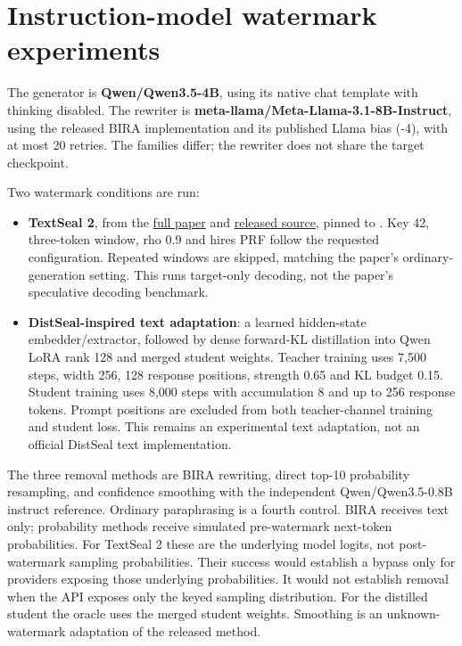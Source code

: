 \section{Instruction-model watermark
experiments}\label{record-docs-instruct-watermarking-md-instruction-model-watermark-experiments}

The generator is \textbf{Qwen/Qwen3.5-4B}, using its native chat
template with thinking disabled. The rewriter is
\textbf{meta-llama/Meta-Llama-3.1-8B-Instruct}, using the released BIRA
implementation and its published Llama bias (-4), with at most 20
retries. The families differ; the rewriter does not share the target
checkpoint.

Two watermark conditions are run:

\begin{itemize}
\tightlist
\item
  \textbf{TextSeal 2}, from the
  \href{https://arxiv.org/pdf/2610.40613}{full paper} and
  \href{https://github.com/facebookresearch/textseal}{released source},
  pinned to
  \texttt{}. Key 42,
  three-token window, rho 0.9 and hires PRF follow the requested
  configuration. Repeated windows are skipped, matching the paper's
  ordinary-generation setting. This runs target-only decoding, not the
  paper's speculative decoding benchmark.
\item
  \textbf{DistSeal-inspired text adaptation}: a learned hidden-state
  embedder/extractor, followed by dense forward-KL distillation into
  Qwen LoRA rank 128 and merged student weights. Teacher training uses
  7,500 steps, width 256, 128 response positions, strength 0.65 and KL
  budget 0.15. Student training uses 8,000 steps with accumulation 8 and
  up to 256 response tokens. Prompt positions are excluded from both
  teacher-channel training and student loss. This remains an
  experimental text adaptation, not an official DistSeal text
  implementation.
\end{itemize}

The three removal methods are BIRA rewriting, direct top-10 probability
resampling, and confidence smoothing with the independent
Qwen/Qwen3.5-0.8B instruct reference. Ordinary paraphrasing is a fourth
control. BIRA receives text only; probability methods receive simulated
pre-watermark next-token probabilities. For TextSeal 2 these are the
underlying model logits, not post-watermark sampling probabilities.
Their success would establish a bypass only for providers exposing those
underlying probabilities. It would not establish removal when the API
exposes only the keyed sampling distribution. For the distilled student
the oracle uses the merged student weights. Smoothing is an
unknown-watermark adaptation of the released method.

